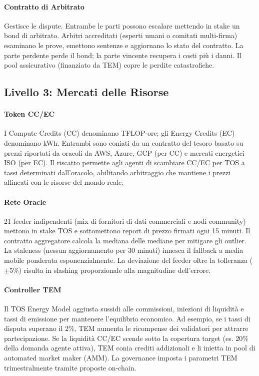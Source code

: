 \documentclass[11pt]{article}
\begin{document}
\paragraph{Contratto di Arbitrato} Gestisce le dispute. Entrambe le parti possono escalare mettendo in stake un bond di arbitrato. Arbitri accreditati (esperti umani o comitati multi-firma) esaminano le prove, emettono sentenze e aggiornano lo stato del contratto. La parte perdente perde il bond; la parte vincente recupera i costi più i danni. Il pool assicurativo (finanziato da TEM) copre le perdite catastrofiche.

\subsection{Livello 3: Mercati delle Risorse}
\paragraph{Token CC/EC} I Compute Credits (CC) denominano TFLOP-ore; gli Energy Credits (EC) denominano kWh. Entrambi sono coniati da un contratto del tesoro basato su prezzi riportati da oracoli da AWS, Azure, GCP (per CC) e mercati energetici ISO (per EC). Il riscatto permette agli agenti di scambiare CC/EC per TOS a tassi determinati dall'oracolo, abilitando arbitraggio che mantiene i prezzi allineati con le risorse del mondo reale.

\paragraph{Rete Oracle} 21 feeder indipendenti (mix di fornitori di dati commerciali e nodi community) mettono in stake TOS e sottomettono report di prezzo firmati ogni 15 minuti. Il contratto aggregatore calcola la mediana delle mediane per mitigare gli outlier. La staleness (nessun aggiornamento per 30 minuti) innesca il fallback a media mobile ponderata esponenzialmente. La deviazione del feeder oltre la tolleranza ($\pm$5\%) risulta in slashing proporzionale alla magnitudine dell'errore.

\paragraph{Controller TEM} Il TOS Energy Model aggiusta sussidi alle commissioni, iniezioni di liquidità e tassi di emissione per mantenere l'equilibrio economico. Ad esempio, se i tassi di disputa superano il 2\%, TEM aumenta le ricompense dei validatori per attrarre partecipazione. Se la liquidità CC/EC scende sotto la copertura target (es. 20\% della domanda agente attiva), TEM conia crediti addizionali e li inietta in pool di automated market maker (AMM). La governance imposta i parametri TEM trimestralmente tramite proposte on-chain.
\end{document}
